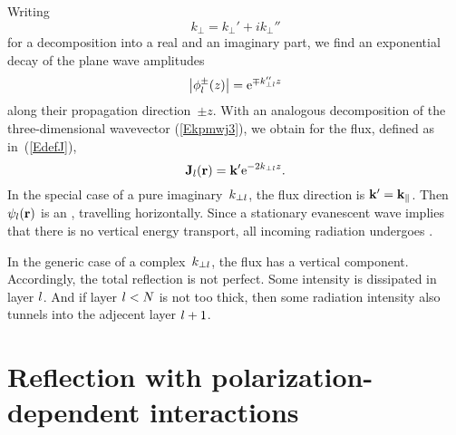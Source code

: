 Writing
\begin{equation}
  k_\perp = k_\perp' + i k_\perp''
\end{equation}
for a decomposition into a real and an imaginary part,
we find an exponential decay of the plane wave amplitudes
\begin{equation}\label{Ephidamp}
  \left|\phi^\pm_l(z)\right|
  = \text{e}^{\mp k_{\perp l}'' z}
\end{equation}
along their propagation direction~$\pm z$.
With an analogous decomposition
of the three-dimensional wavevector (\ref{Ekpmwj3}),
we obtain for the flux, defined as in~(\ref{EdefJ}),
\begin{equation}
  \mathbf{J}_l(\mathbf{r}) = \mathbf{k}' \text{e}^{-2k_{\perp l}z}.
\end{equation}
In the special case of a pure imaginary~$k_{\perp l}$,
the flux direction is $\mathbf{k}'=\mathbf{k}_\parallel$.
Then $\psi_l(\mathbf{r})$ is an ,
%
travelling horizontally.
Since a stationary evanescent wave implies that there is
no vertical energy transport,
all incoming radiation undergoes .
%

In the generic case of a complex~$k_{\perp l}$,
the flux has a vertical component.
Accordingly, the total reflection is not perfect.
Some intensity is dissipated in layer $l$.
%
And if layer $l<N$ is not too thick,
then some radiation intensity also tunnels into the adjecent layer $l+1$.
%


\section{Reflection with polarization-dependent interactions}\label{s:pol}

\MissingSection
% 
%
